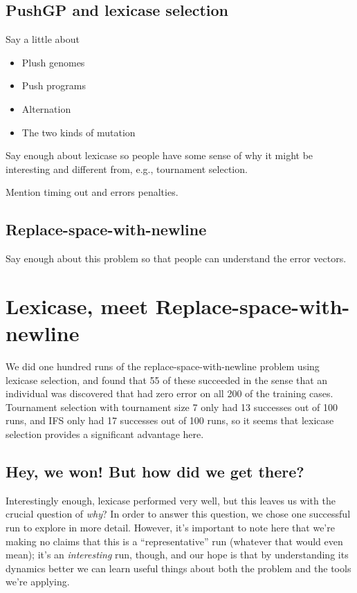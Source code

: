 \subsection{PushGP and lexicase selection}

Say a little about
\begin{itemize}
	\item Plush genomes
	\item Push programs
	\item Alternation
	\item The two kinds of mutation
\end{itemize}

Say enough about lexicase so people have some sense of why it might be interesting and different
from, e.g., tournament selection.

Mention timing out and errors penalties.

\subsection{Replace-space-with-newline}

Say enough about this problem so that people can understand the error vectors.

\section{Lexicase, meet Replace-space-with-newline}

We did one hundred runs of the replace-space-with-newline problem using lexicase selection, and
found that 55 of these succeeded in the sense that an individual was discovered that had zero
error on all 200 of the training cases. Tournament selection with tournament size 7 only
had 13 successes out of 100 runs, and IFS only had 17 successes out of 100 runs, so it seems that
lexicase selection provides a significant advantage here.

\subsection{Hey, we won! But how did we get there?}


Interestingly enough, lexicase performed very well, but this leaves us with the crucial question of \emph{why}? 
In order to answer this question, we chose one successful run to explore in more detail. However, it's important to note
here that we're making no claims that this is a ``representative'' run (whatever that would even
mean); it's an \emph{interesting} run, though, and our hope is that by understanding its dynamics
better we can learn useful things about both the problem and the tools we're applying.

